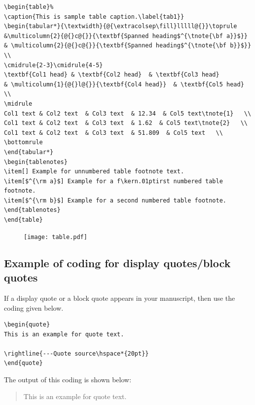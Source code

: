 \documentclass[11pt]{article}
\begin{document}
\begin{verbatim}
\begin{table}%
\caption{This is sample table caption.\label{tab1}}
\begin{tabular*}{\textwidth}{@{\extracolsep\fill}lllll@{}}\toprule
&\multicolumn{2}{@{}c@{}}{\textbf{Spanned heading$^{\tnote{\bf a}}$}}
& \multicolumn{2}{@{}c@{}}{\textbf{Spanned heading$^{\tnote{\bf b}}$}} \\
\cmidrule{2-3}\cmidrule{4-5}
\textbf{Col1 head} & \textbf{Col2 head}  & \textbf{Col3 head}
& \multicolumn{1}{@{}l@{}}{\textbf{Col4 head}}  & \textbf{Col5 head}   \\
\midrule
Col1 text & Col2 text  & Col3 text  & 12.34  & Col5 text\tnote{1}   \\
Col1 text & Col2 text  & Col3 text  & 1.62  & Col5 text\tnote{2}   \\
Col1 text & Col2 text  & Col3 text  & 51.809  & Col5 text   \\
\bottomrule
\end{tabular*}
\begin{tablenotes}
\item[] Example for unnumbered table footnote text.
\item[$^{\rm a}$] Example for a f\kern.01ptirst numbered table footnote.
\item[$^{\rm b}$] Example for a second numbered table footnote.
\end{tablenotes}
\end{table}
\end{verbatim}

\begin{figure}[!h]
\vspace*{-26pt}
\hspace*{-24pt}
\texttt{[image: table.pdf]}
\vspace*{-20pt}
\end{figure}



\subsection{Example of coding for display quotes/block quotes}

If a display quote or a block quote appears in your manuscript, then use the coding given below.
\begin{verbatim}
\begin{quote}
This is an example for quote text.

\rightline{---Quote source\hspace*{20pt}}
\end{quote}
\end{verbatim}
The output of this coding is shown below:
\begin{quote}
This is an example for quote text.

\end{quote}
\end{document}
